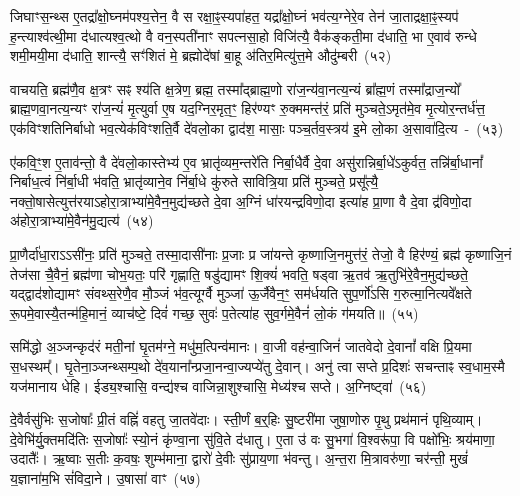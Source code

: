 जिघाꣳस॒न्थ्स ए॒तद्रा᳚क्षो॒घ्नम॑पश्य॒त्तेन॒ वै स रक्षा॒ꣴ॒स्यपा॑हत॒ यद्रा᳚क्षो॒घ्नं भव॑त्य॒ग्नेरे॒व तेन॑ जा॒ताद्रक्षा॒ꣴ॒स्यप॑ ह॒न्त्याश्व॑त्थी॒मा द॑धात्यश्व॒त्थो वै वन॒स्पती॑नाꣳ सपत्नसा॒हो विजि॑त्यै॒ वैक॑ङ्कती॒मा द॑धाति॒ भा ए॒वाव॑ रुन्धे शमी॒मयी॒मा द॑धाति॒ शान्त्यै॒ सꣳ॑शितं मे॒ ब्रह्मोदे॑षां बा॒हू अ॑तिर॒मित्यु॑त्त॒मे औदु॑म्बरी~(५२)\ip

वाचयति॒ ब्रह्म॑णै॒व क्ष॒त्रꣳ सꣴ श्य॑ति क्ष॒त्रेण॒ ब्रह्म॒ तस्मा᳚द्\-ब्राह्म॒णो रा॑ज॒न्य॑वा॒नत्य॒न्यं ब्रा᳚ह्म॒णं तस्मा᳚द्\-राज॒न्यो᳚ ब्राह्म॒णवा॒नत्य॒न्यꣳ रा॑ज॒न्यं॑ मृ॒त्युर्वा ए॒ष यद॒ग्निर॒मृत॒ꣳ॒ हिर॑ण्यꣳ रु॒क्ममन्त॑रं॒ प्रति॑ मुञ्चते॒\-ऽमृत॑मे॒व मृ॒त्योर॒न्तर्ध॑त्त॒ एक॑विꣳशतिनिर्बाधो भव॒त्येक॑विꣳशति॒र्वै दे॑वलो॒का द्वाद॑श॒ मासाः॒ पञ्च॒र्तव॒स्त्रय॑ इ॒मे लो॒का अ॒सावा॑दि॒त्य~-~(५३)\ip

ए॑कवि॒ꣳ॒श ए॒ताव॑न्तो॒ वै दे॑वलो॒कास्तेभ्य॑ ए॒व भ्रातृ॑व्यम॒न्तरे॑ति निर्बा॒धैर्वै दे॒वा असु॑रान्निर्बा॒धे॑\-ऽकुर्वत॒ तन्नि॑र्बा॒धानां᳚ निर्बाध॒त्वं नि॑र्बा॒धी भ॑वति॒ भ्रातृ॑व्याने॒व नि॑र्बा॒धे कु॑रुते सावित्रि॒या प्रति॑ मुञ्चते॒ प्रसू᳚त्यै॒ नक्तो॒षासेत्युत्त॑रयाऽहोरा॒त्राभ्या॑\-मे॒वैन॒मुद्य॑च्छते दे॒वा अ॒ग्निं धा॑रयन्द्रविणो॒दा इत्या॑ह प्रा॒णा वै दे॒वा द्र॑विणो॒दा अ॑होरा॒त्राभ्या॑मे॒वैन॑मु॒द्यत्य॑~(५४)\ip

प्रा॒णैर्दा॑धा॒रा\-ऽऽसी॑नः॒ प्रति॑ मुञ्चते॒ तस्मा॒दासी॑नाः प्र॒जाः प्र जा॑यन्ते कृष्णाजि॒नमुत्त॑रं॒ तेजो॒ वै हिर॑ण्यं॒ ब्रह्म॑ कृष्णाजि॒नं तेज॑सा चै॒वैनं॒ ब्रह्म॑णा चोभ॒यतः॒ परि॑ गृह्णाति॒ षडु॑द्यामꣳ शि॒क्यं॑ भवति॒ षड्वा ऋ॒तव॑ ऋ॒तुभि॑रे॒वैन॒मुद्य॑च्छते॒ यद्द्वाद॑शोद्यामꣳ संवथ्स॒रेणै॒व मौ॒ञ्जं भ॑व॒त्यूर्ग्वै मुञ्जा॑ ऊ॒र्जैवैन॒ꣳ॒ सम॑र्धयति सुप॒र्णो॑\-ऽसि ग॒रुत्मा॒नित्यवे᳚क्षते रू॒पमे॒वास्यै॒तन्म॑हि॒मानं॒ व्याच॑ष्टे॒ दिवं॑ गच्छ॒ सुवः॑ प॒तेत्या॑ह सुव॒र्गमे॒वैनं॑ लो॒कं ग॑मयति॥~(५५)\ip

{\anuvakamend[{रक्षा॒ꣴ॒स्यौदु॑म्बरी आदि॒त्य उ॒द्यत्य॒ स़ञ्चतु॑र्विꣳशतिश्च}]}%

समि॑द्धो अ॒ञ्जन्कृद॑रं मती॒नां घृ॒तम॑ग्ने॒ मधु॑म॒त्पिन्व॑मानः। वा॒जी वह॑न्वा॒जिनं॑ जातवेदो दे॒वानां᳚ वक्षि प्रि॒यमा स॒धस्थम्᳚। घृ॒तेना॒ञ्जन्थ्सम्प॒थो दे॑व॒याना᳚न्प्रजा॒नन्वा॒ज्यप्ये॑तु दे॒वान्। अनु॑ त्वा सप्ते प्र॒दिशः॑ सचन्ताꣴ स्व॒धाम॒स्मै यज॑मानाय धेहि। ईड्य॒श्चासि॒ वन्द्य॑श्च वाजिन्ना॒शुश्चासि॒ मेध्य॑श्च सप्ते। अ॒ग्निष्ट्वा॑~(५६)\ip

दे॒वैर्वसु॑भिः स॒जोषाः᳚ प्री॒तं वह्निं॑ वहतु जा॒तवे॑दाः। स्ती॒र्णं ब॒र्॒\mbox{}हिः सु॒ष्टरी॑मा जुषा॒णोरु पृ॒थु प्रथ॑मानं पृथि॒व्याम्। दे॒वेभि॑र्यु॒क्तमदि॑तिः स॒जोषाः᳚ स्यो॒नं कृ॑ण्वा॒ना सु॑वि॒ते द॑धातु। ए॒ता उ॑ वः सु॒भगा॑ वि॒श्वरू॑पा॒ वि पक्षो॑भिः॒ श्रय॑माणा॒ उदातैः᳚। ऋ॒ष्वाः स॒तीः क॒वषः॒ शुम्भ॑माना॒ द्वारो॑ दे॒वीः सु॑प्राय॒णा भ॑वन्तु। अ॒न्त॒रा मि॒त्रावरु॑णा॒ चर॑न्ती॒ मुखं॑ य॒ज्ञाना॑म॒भि सं॑विदा॒ने। उ॒षासा॑ वाꣳ~(५७)\ip

